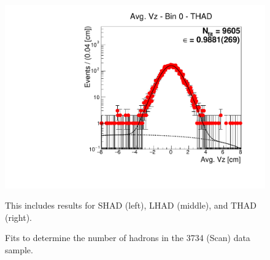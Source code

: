 \begin{figure}[H]
\includegraphics[scale=0.25]{figures/plots/nonDDbar_fit_results/scan/fit_scan_00_data_THAD.pdf}
\caption{Fits to determine the number of hadrons in the 3734 (Scan) data sample.}
{This includes results for SHAD (left), LHAD (middle), and THAD (right).}
\label{fig:hadron_fits_scan_00}
\end{figure}

